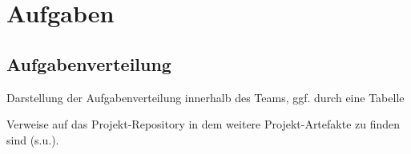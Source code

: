 \chapter{Aufgaben}

\section{Aufgabenverteilung}

Darstellung der Aufgabenverteilung innerhalb des Teams, ggf. durch
eine Tabelle

Verweise auf das Projekt-Repository in dem weitere
Projekt-Artefakte zu finden sind (s.u.).